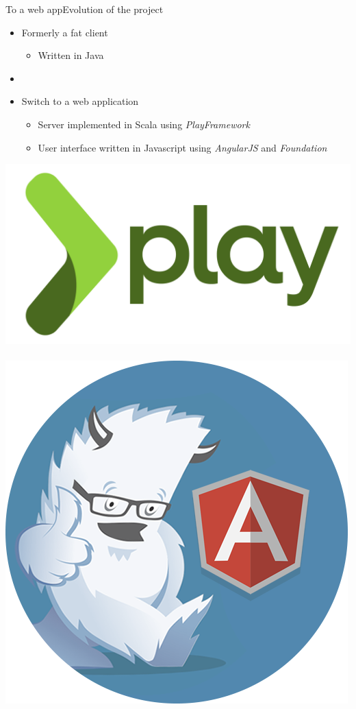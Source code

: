 \documentclass{beamer}
\begin{document}
\begin{frame}{To a web app}{Evolution of the project}
  \begin{itemize}
    \item {
      Formerly a fat client
      \begin{itemize}
        \item { Written in Java }
      \end{itemize}
      \pause
    }
    \item[~]
    \item {
      Switch to a web application
      \begin{itemize}
        \item { Server implemented in Scala using \emph{PlayFramework} }
        \item { User interface written in Javascript using \emph{AngularJS} and \emph{Foundation} }
      \end{itemize}
    }
  \end{itemize}
  \begin{center}
    \includegraphics[scale=0.05]{img/play-logo.png}
    ~
    \includegraphics[scale=0.1]{img/foundation-angular.png}
  \end{center}
\end{frame}
\end{document}
